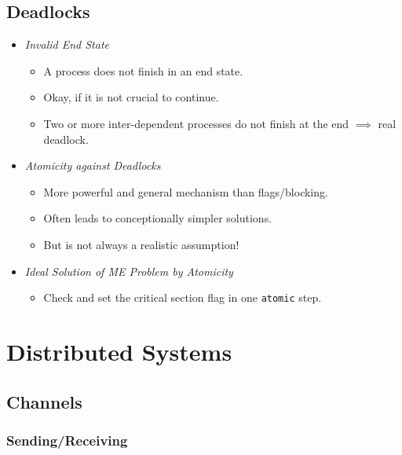 \documentclass[a4paper, 11pt, accentcolor = tud3b]{tudreport}
\newcommand{\inlinePromela}[1]{\lstinline[language = PROMELA]|#1|}
\begin{document}
			\subsection{Deadlocks}
				\begin{itemize}
					\item \textit{Invalid End State}
						\begin{itemize}
							\item A process does not finish in an end state.
							\item Okay, if it is not crucial to continue.
							\item Two or more inter-dependent processes do not finish at the end \(\implies\) real deadlock.
						\end{itemize}
					\item \textit{Atomicity against Deadlocks}
						\begin{itemize}
							\item More powerful and general mechanism than flags/blocking.
							\item Often leads to conceptionally simpler solutions.
							\item But is not always a realistic assumption!
						\end{itemize}
					\item \textit{Ideal Solution of ME Problem by Atomicity}
						\begin{itemize}
							\item Check and set the critical section flag in one \inlinePromela{atomic} step.
						\end{itemize}
				\end{itemize}

		\section{Distributed Systems} %
			\label{sec:distributed}
		

			\subsection{Channels} %

				\subsubsection{Sending/Receiving} %
\end{document}
